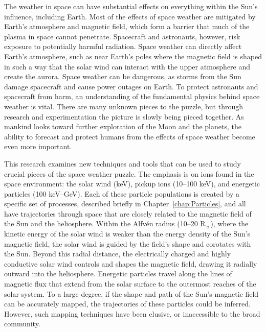 The weather in space can have substantial effects on everything within the Sun's influence, including Earth. Most of the effects of space weather are mitigated by Earth's atmosphere and magnetic field, which form a barrier that much of the plasma in space cannot penetrate. Spacecraft and astronauts, however, risk exposure to potentially harmful radiation. Space weather can directly affect Earth's atmosphere, such as near Earth's poles where the magnetic field is shaped in such a way that the solar wind can interact with the upper atmosphere and create the aurora. Space weather can be dangerous, as storms from the Sun damage spacecraft and cause power outages on Earth. To protect astronauts and spacecraft from harm, an understanding of the fundamental physics behind space weather is vital. There are many unknown pieces to the puzzle, but through research and experimentation the picture is slowly being pieced together. As mankind looks toward further exploration of the Moon and the planets, the ability to forecast and protect humans from the effects of space weather become even more important.

This research examines new techniques and tools that can be used to study crucial pieces of the space weather puzzle. The emphasis is on ions found in the space environment: the solar wind (keV), pickup ions (10--100 keV), and energetic particles (100 keV--GeV). Each of these particle populations is created by a specific set of processes, described briefly in Chapter~\ref{chap:Particles}, and all have trajectories through space that are closely related to the magnetic field of the Sun and the heliosphere. Within the Alfv\'{e}n radius (10--20 R$_\sun$), where the kinetic energy of the solar wind is weaker than the energy density of the Sun's magnetic field, the solar wind is guided by the field's shape and corotates with the Sun. Beyond this radial distance, the electrically charged and highly conductive solar wind controls and shapes the magnetic field, drawing it radially outward into the heliosphere. Energetic particles travel along the lines of magnetic flux that extend from the solar surface to the outermost reaches of the solar system. To a large degree, if the shape and path of the Sun's magnetic field can be accurately mapped, the trajectories of these particles could be inferred. However, such mapping techniques have been elusive, or inaccessible to the broad community.
